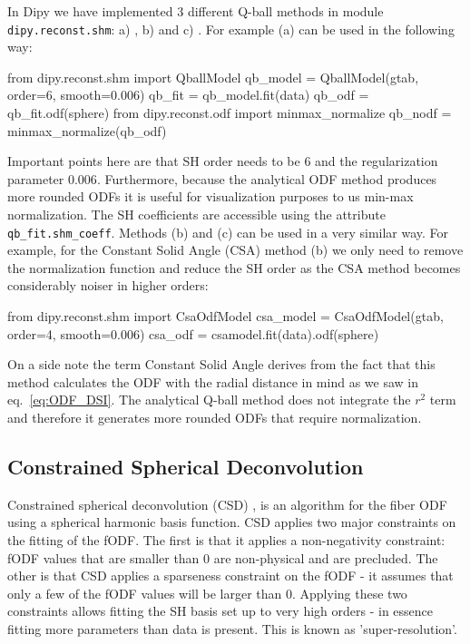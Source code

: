 \documentclass{bioinfo}
\begin{document}
In Dipy we have implemented 3 different Q-ball methods in module \texttt{dipy.reconst.shm}: a) \citep{descoteaux-angelino-etal:07}, b) \citep{aganj-lenglet-etal:10} and c) \citep{tristan-vega-westin-etal:09}. For example (a) can be used in the following way:
\begin{python}
from dipy.reconst.shm import QballModel
qb_model = QballModel(gtab, order=6, smooth=0.006)
qb_fit = qb_model.fit(data)
qb_odf = qb_fit.odf(sphere)
from dipy.reconst.odf import minmax_normalize
qb_nodf = minmax_normalize(qb_odf)
\end{python}
Important points here are that SH order needs to be $6$ and the regularization parameter $0.006$. Furthermore, because the analytical ODF method produces more rounded ODFs it is useful for visualization purposes to us min-max normalization. The SH coefficients are accessible using the attribute \texttt{qb\_fit.shm\_coeff}. Methods (b) and (c) can be used in a very similar way. For example, for the Constant Solid Angle (CSA) \citep{aganj-lenglet-etal:10} method (b) we only need to remove the normalization function and reduce the SH order as the CSA method becomes considerably noiser in higher orders:
\begin{python}
from dipy.reconst.shm import CsaOdfModel
csa_model = CsaOdfModel(gtab, order=4,
                        smooth=0.006)
csa_odf = csamodel.fit(data).odf(sphere)
\end{python}
On a side note the term Constant Solid Angle derives from the fact that this method calculates the ODF with the radial distance in mind as we saw in eq.~\ref{eq:ODF_DSI}. The analytical Q-ball method does not integrate the $r^2$ term and therefore it generates more rounded ODFs that require normalization.

\subsection{Constrained Spherical Deconvolution}

Constrained spherical deconvolution (CSD) \citep{tournier-calamante-etal:07}, is an algorithm for  the fiber ODF using a spherical harmonic basis function. CSD applies two major constraints on the fitting of the fODF. The first is that it applies a non-negativity constraint: fODF values that are smaller than 0 are non-physical and are precluded. The other is that CSD applies a sparseness constraint on the fODF - it assumes that only a few of the fODF values will be larger than 0. Applying these two constraints allows fitting the SH basis set up to very high orders - in essence fitting more parameters than data is present. This is known as 'super-resolution'.
\end{document}

